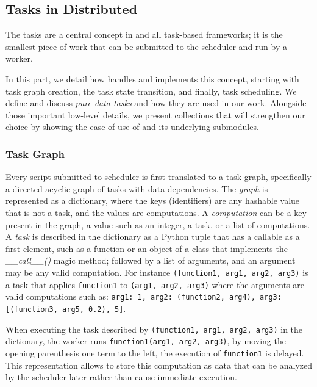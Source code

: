 \subsection{Tasks in \dask Distributed}\label{sec:task}

The tasks are a central concept in \dask and all task-based frameworks; it is the smallest piece of work that can be submitted to the scheduler and run by a worker. 

In this part, we detail how \dask handles and implements this concept, starting with task graph creation, the task state transition, and finally, task scheduling. 
We define and discuss \textit{pure data tasks} and how they are used in our work. Alongside those important low-level details, we present \dask collections that will strengthen our choice by showing the ease of use of \dask and its underlying submodules.  

\subsubsection{Task Graph}\label{sec:taskgraph}

Every script submitted to \dask scheduler is first translated to a task graph, specifically a directed acyclic graph of tasks with data dependencies. 
The \textit{graph} is represented as a dictionary, where the keys (identifiers) are any hashable value that is not a task, and the values are computations. 
A \textit{computation} can be a key present in the graph, a value such as an integer, a task, or a list of computations. 
A \textit{task} is described in the dictionary as a Python tuple that has a callable as a first element, such as a function or an object of a class that implements the \textit{\_\_call\_\_()} magic method; followed by a list of arguments, and an argument may be any valid computation.
For instance \texttt{(function1, arg1, arg2, arg3)} is a task that applies \texttt{function1} to \texttt{(arg1, arg2, arg3)} where the arguments are valid computations such as: \texttt{{arg1: 1, arg2: (function2, arg4), arg3: [(function3, arg5, 0.2), 5]}}.

When executing the task described by \texttt{(function1, arg1, arg2, arg3)} in the dictionary, the worker runs \texttt{function1(arg1, arg2, arg3)}, by moving the opening parenthesis one term to the left, the execution of \texttt{function1} is delayed. This representation allows \dask to store this computation as data that can be analyzed by the scheduler later rather than cause immediate execution.   

